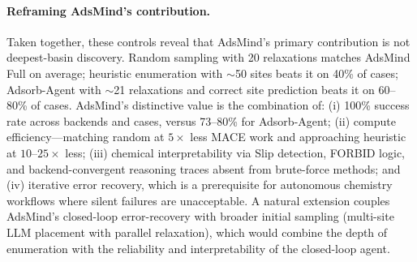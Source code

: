 \paragraph{Reframing AdsMind's contribution.}
Taken together, these controls reveal that AdsMind's primary contribution is not deepest-basin discovery.
Random sampling with 20 relaxations matches AdsMind Full on average; heuristic enumeration with $\sim$50 sites beats it on 40\% of cases; Adsorb-Agent with $\sim$21 relaxations and correct site prediction beats it on 60--80\% of cases.
AdsMind's distinctive value is the combination of: (i) 100\% success rate across backends and cases, versus 73--80\% for Adsorb-Agent; (ii) compute efficiency---matching random at $5\times$ less MACE work and approaching heuristic at $10$--$25\times$ less; (iii) chemical interpretability via Slip detection, FORBID logic, and backend-convergent reasoning traces absent from brute-force methods; and (iv) iterative error recovery, which is a prerequisite for autonomous chemistry workflows where silent failures are unacceptable.
A natural extension couples AdsMind's closed-loop error-recovery with broader initial sampling (multi-site LLM placement with parallel relaxation), which would combine the depth of enumeration with the reliability and interpretability of the closed-loop agent.

